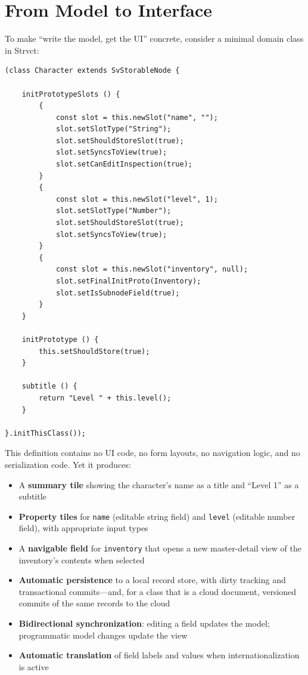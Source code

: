 \documentclass[sigplan,review,anonymous,10pt]{acmart}
\begin{document}
\section{From Model to Interface}
\label{sec:model-to-interface}

To make ``write the model, get the UI'' concrete, consider a minimal domain class in Strvct:

\begin{verbatim}
(class Character extends SvStorableNode {

    initPrototypeSlots () {
        {
            const slot = this.newSlot("name", "");
            slot.setSlotType("String");
            slot.setShouldStoreSlot(true);
            slot.setSyncsToView(true);
            slot.setCanEditInspection(true);
        }
        {
            const slot = this.newSlot("level", 1);
            slot.setSlotType("Number");
            slot.setShouldStoreSlot(true);
            slot.setSyncsToView(true);
        }
        {
            const slot = this.newSlot("inventory", null);
            slot.setFinalInitProto(Inventory);
            slot.setIsSubnodeField(true);
        }
    }

    initPrototype () {
        this.setShouldStore(true);
    }

    subtitle () {
        return "Level " + this.level();
    }

}.initThisClass());
\end{verbatim}

This definition contains no UI code, no form layouts, no navigation logic, and no serialization code. Yet it produces:

\begin{itemize}
\item A \textbf{summary tile} showing the character's name as a title and ``Level 1'' as a subtitle
\item \textbf{Property tiles} for \texttt{name} (editable string field) and \texttt{level} (editable number field), with appropriate input types
\item A \textbf{navigable field} for \texttt{inventory} that opens a new master-detail view of the inventory's contents when selected
\item \textbf{Automatic persistence} to a local record store, with dirty tracking and transactional commits---and, for a class that is a cloud document, versioned commits of the same records to the cloud
\item \textbf{Bidirectional synchronization}: editing a field updates the model; programmatic model changes update the view
\item \textbf{Automatic translation} of field labels and values when internationalization is active
\end{itemize}
\end{document}
